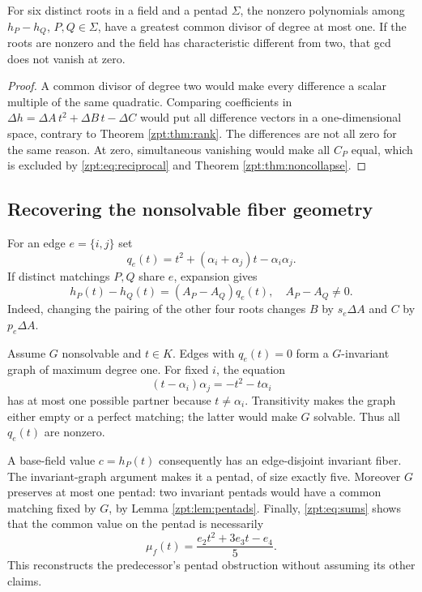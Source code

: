 \documentclass[11pt,letterpaper]{article}
\numberwithin{equation}{section}
\theoremstyle{definition}
\theoremstyle{remark}
\begin{document}
\begin{corollary}
\label{zpt:cor:one-pentad}
For six distinct roots in a field and a pentad $\Sigma$, the nonzero
polynomials among $h_P-h_Q$, $P,Q\in\Sigma$, have a greatest common
divisor of degree at most one. If the roots are nonzero and the field has
characteristic different from two, that gcd does not vanish at zero.
\end{corollary}
\begin{proof}
A common divisor of degree two would make every difference a scalar
multiple of the same quadratic. Comparing coefficients in
$\Delta h=\Delta A\,t^2+\Delta B\,t-\Delta C$ would put all difference
vectors in a one-dimensional space, contrary to Theorem \ref{zpt:thm:rank}.
The differences are not all zero for the same reason. At zero, simultaneous
vanishing would make all $C_P$ equal, which is excluded by
\eqref{zpt:eq:reciprocal} and Theorem \ref{zpt:thm:noncollapse}.
\end{proof}

\subsection{Recovering the nonsolvable fiber geometry}
For an edge $e=\{i,j\}$ set
\begin{equation}
 q_e(t)=t^2+(\alpha_i+\alpha_j)t-\alpha_i\alpha_j.\label{zpt:eq:q}
\end{equation}
If distinct matchings $P,Q$ share $e$, expansion gives
\begin{equation}
 h_P(t)-h_Q(t)=(A_P-A_Q)q_e(t),\quad A_P-A_Q\ne0.\label{zpt:eq:shared}
\end{equation}
Indeed, changing the pairing of the other four roots changes $B$ by
$s_e\Delta A$ and $C$ by $p_e\Delta A$.

Assume $G$ nonsolvable and $t\in K$. Edges with $q_e(t)=0$ form a
$G$-invariant graph of maximum degree one. For fixed $i$, the equation
\[
 (t-\alpha_i)\alpha_j=-t^2-t\alpha_i
\]
has at most one possible partner because $t\ne\alpha_i$. Transitivity
makes the graph either empty or a perfect matching; the latter would make
$G$ solvable. Thus all $q_e(t)$ are nonzero.

A base-field value $c=h_P(t)$ consequently has an edge-disjoint invariant
fiber. The invariant-graph argument makes it a pentad, of size exactly
five. Moreover $G$ preserves at most one pentad: two invariant pentads
would have a common matching fixed by $G$, by Lemma \ref{zpt:lem:pentads}.
Finally, \eqref{zpt:eq:sums} shows that the common value on the pentad is
necessarily
\begin{equation}
 \mu_f(t)=\frac{e_2t^2+3e_3t-e_4}{5}.\label{zpt:eq:mu}
\end{equation}
This reconstructs the predecessor's pentad obstruction without assuming
its other claims.
\end{document}
